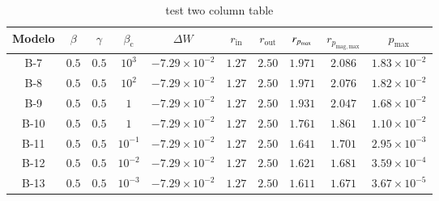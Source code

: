 \documentclass{aa}
\begin{document}
\begin{table}
\caption{test two column table}             
\label{table:1}      
\centering          
\begin{tabular}{c c c c c c c c c c}
\hline\hline       
                      
Modelo & $\beta$ & $\gamma$ & $\beta_{\mathrm{c}}$ & $\Delta W$ & $r_{\mathrm{in}}$ & $r_{\mathrm{out}}$ & $r_{p_{\rm{max}}}$ & $r_{p_{\mathrm{mag, max}}}$ & $p_{\mathrm{max}}$\\ 
\hline                    
  B-7 & $0.5$ & $0.5$ & $10^{3}$ & $-7.29 \times 10^{-2}$ & $1.27$ & $2.50$ & $1.971$ & $2.086$ & $1.83 \times 10^{-2}$\\ 
  B-8 & $0.5$ & $0.5$ & $10^{2}$ & $-7.29 \times 10^{-2}$ & $1.27$ & $2.50$ & $1.971$ & $2.076$ & $1.82 \times 10^{-2}$\\ 
  B-9 & $0.5$ & $0.5$ & $1$ & $-7.29 \times 10^{-2}$ & $1.27$ & $2.50$ & $1.931$ & $2.047$ & $1.68 \times 10^{-2}$\\ 
  B-10 & $0.5$ & $0.5$ & $1$ & $-7.29 \times 10^{-2}$ & $1.27$ & $2.50$ & $1.761$ & $1.861$ & $1.10 \times 10^{-2}$\\ 
  B-11 & $0.5$ & $0.5$ & $10^{-1}$ & $-7.29 \times 10^{-2}$ & $1.27$ & $2.50$ & $1.641$ & $1.701$ & $2.95 \times 10^{-3}$\\ 
  B-12 & $0.5$ & $0.5$ & $10^{-2}$ & $-7.29 \times 10^{-2}$ & $1.27$ & $2.50$ & $1.621$ & $1.681$ & $3.59 \times 10^{-4}$\\ 
  B-13 & $0.5$ & $0.5$ & $10^{-3}$ & $-7.29 \times 10^{-2}$ & $1.27$ & $2.50$ & $1.611$ & $1.671$ & $3.67 \times 10^{-5}$\\ 
\hline                  
\end{tabular}
\end{table}
\end{document}

